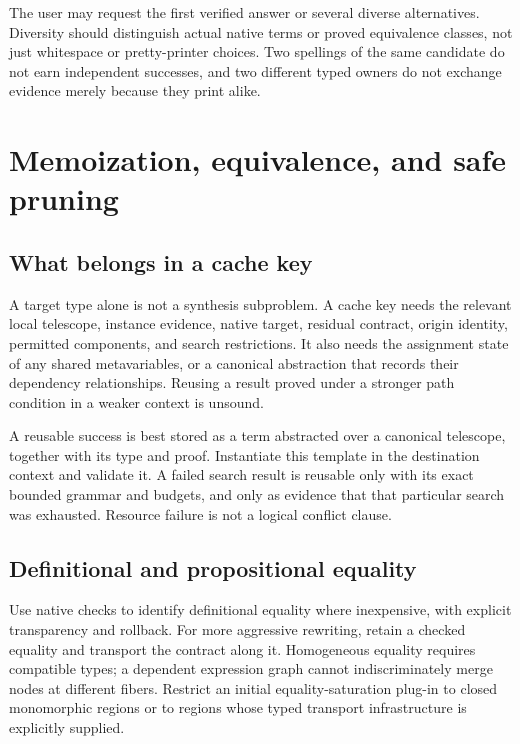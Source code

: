 The user may request the first verified answer or several diverse alternatives. Diversity should distinguish actual native terms or proved equivalence classes, not just whitespace or pretty-printer choices. Two spellings of the same candidate do not earn independent successes, and two different typed owners do not exchange evidence merely because they print alike.

\section{Memoization, equivalence, and safe pruning}
\label{sec:pruning}

\subsection{What belongs in a cache key}

A target type alone is not a synthesis subproblem. A cache key needs the relevant local telescope, instance evidence, native target, residual contract, origin identity, permitted components, and search restrictions. It also needs the assignment state of any shared metavariables, or a canonical abstraction that records their dependency relationships. Reusing a result proved under a stronger path condition in a weaker context is unsound.

A reusable success is best stored as a term abstracted over a canonical telescope, together with its type and proof. Instantiate this template in the destination context and validate it. A failed search result is reusable only with its exact bounded grammar and budgets, and only as evidence that that particular search was exhausted. Resource failure is not a logical conflict clause.

\subsection{Definitional and propositional equality}

Use native checks to identify definitional equality where inexpensive, with explicit transparency and rollback. For more aggressive rewriting, retain a checked equality and transport the contract along it. Homogeneous equality requires compatible types; a dependent expression graph cannot indiscriminately merge nodes at different fibers. Restrict an initial equality-saturation plug-in to closed monomorphic regions or to regions whose typed transport infrastructure is explicitly supplied.


